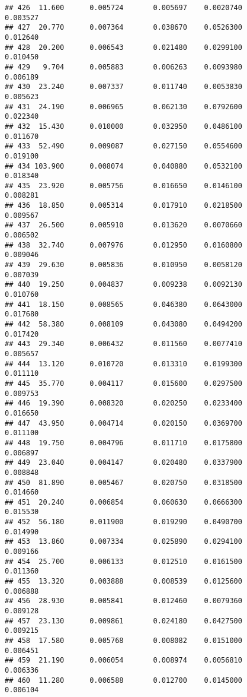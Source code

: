\documentclass[
]{article}
\begin{document}
\begin{verbatim}
## 426  11.600      0.005724       0.005697    0.0020740          0.003527
## 427  20.770      0.007364       0.038670    0.0526300          0.012640
## 428  20.200      0.006543       0.021480    0.0299100          0.010450
## 429   9.704      0.005883       0.006263    0.0093980          0.006189
## 430  23.240      0.007337       0.011740    0.0053830          0.005623
## 431  24.190      0.006965       0.062130    0.0792600          0.022340
## 432  15.430      0.010000       0.032950    0.0486100          0.011670
## 433  52.490      0.009087       0.027150    0.0554600          0.019100
## 434 103.900      0.008074       0.040880    0.0532100          0.018340
## 435  23.920      0.005756       0.016650    0.0146100          0.008281
## 436  18.850      0.005314       0.017910    0.0218500          0.009567
## 437  26.500      0.005910       0.013620    0.0070660          0.006502
## 438  32.740      0.007976       0.012950    0.0160800          0.009046
## 439  29.630      0.005836       0.010950    0.0058120          0.007039
## 440  19.250      0.004837       0.009238    0.0092130          0.010760
## 441  18.150      0.008565       0.046380    0.0643000          0.017680
## 442  58.380      0.008109       0.043080    0.0494200          0.017420
## 443  29.340      0.006432       0.011560    0.0077410          0.005657
## 444  13.120      0.010720       0.013310    0.0199300          0.011110
## 445  35.770      0.004117       0.015600    0.0297500          0.009753
## 446  19.390      0.008320       0.020250    0.0233400          0.016650
## 447  43.950      0.004714       0.020150    0.0369700          0.011100
## 448  19.750      0.004796       0.011710    0.0175800          0.006897
## 449  23.040      0.004147       0.020480    0.0337900          0.008848
## 450  81.890      0.005467       0.020750    0.0318500          0.014660
## 451  20.240      0.006854       0.060630    0.0666300          0.015530
## 452  56.180      0.011900       0.019290    0.0490700          0.014990
## 453  13.860      0.007334       0.025890    0.0294100          0.009166
## 454  25.700      0.006133       0.012510    0.0161500          0.011360
## 455  13.320      0.003888       0.008539    0.0125600          0.006888
## 456  28.930      0.005841       0.012460    0.0079360          0.009128
## 457  23.130      0.009861       0.024180    0.0427500          0.009215
## 458  17.580      0.005768       0.008082    0.0151000          0.006451
## 459  21.190      0.006054       0.008974    0.0056810          0.006336
## 460  11.280      0.006588       0.012700    0.0145000          0.006104

\end{verbatim}
\end{document}
